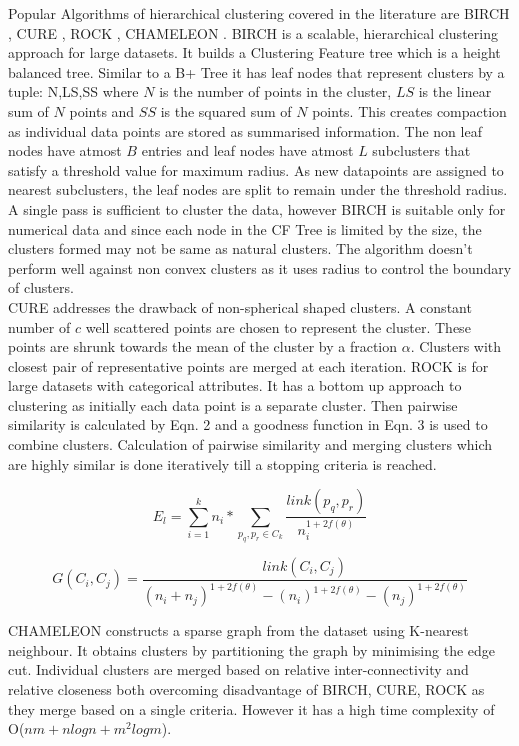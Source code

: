 Popular Algorithms of hierarchical clustering covered in the literature are BIRCH \cite{aps:42}, CURE \cite{aps:43}, ROCK \cite{aps:43}, CHAMELEON \cite{aps:44}. BIRCH is a scalable, hierarchical clustering approach for large datasets. It builds a Clustering Feature tree which is a height balanced tree. Similar to a B+ Tree it has leaf nodes that represent clusters by a tuple: {N,LS,SS} where $N$ is the number of points in the cluster, $LS$ is the linear sum of $N$ points and $SS$ is the squared sum of $N$ points. This creates compaction as individual data points are stored as summarised information. The non leaf nodes have atmost $B$ entries and leaf nodes have atmost $L$ subclusters that satisfy a threshold value for maximum radius. As new datapoints are assigned to nearest subclusters, the leaf nodes are split to remain under the threshold radius. A single pass is sufficient to cluster the data, however BIRCH is suitable only for numerical data and since each node in the CF Tree is limited by the size, the clusters formed may not be same as natural clusters. The algorithm doesn't perform well against non convex clusters as it uses radius to control the boundary of clusters.\\

CURE addresses the drawback of non-spherical shaped clusters. A constant number of $c$ well scattered points are chosen to represent the cluster. These points are shrunk towards the mean of the cluster by a fraction $\alpha$. Clusters with closest pair of representative points are merged at each iteration. ROCK is for large datasets with categorical attributes. It has a bottom up approach to clustering as initially each data point is a separate cluster. Then pairwise similarity is calculated by Eqn. 2 and a goodness function in Eqn. 3 is used to combine clusters. Calculation of pairwise similarity and merging clusters which are highly similar is done iteratively till a stopping criteria is reached. 

\begin{equation}
E_l = \sum_{i=1}^{k}n_i * \sum_{p_q,p_r \in C_k} \frac{link(p_q,p_r)}{n_i^{1+2f(\theta)}} 
\end{equation}

\begin{equation}
G(C_i,C_j) = \frac{link(C_i,C_j)}{(n_i+n_j)^{1+2f(\theta)} - (n_i)^{1+2f(\theta)} - (n_j)^{1+2f(\theta)}}  
\end{equation}  

CHAMELEON constructs a sparse graph from the dataset using K-nearest neighbour. It obtains clusters by partitioning the graph by minimising the edge cut. Individual clusters are merged based on relative inter-connectivity and relative closeness both overcoming disadvantage of BIRCH, CURE, ROCK as they merge based on a single criteria. However it has a high time complexity of O($nm + n log n + m^2log m$).


